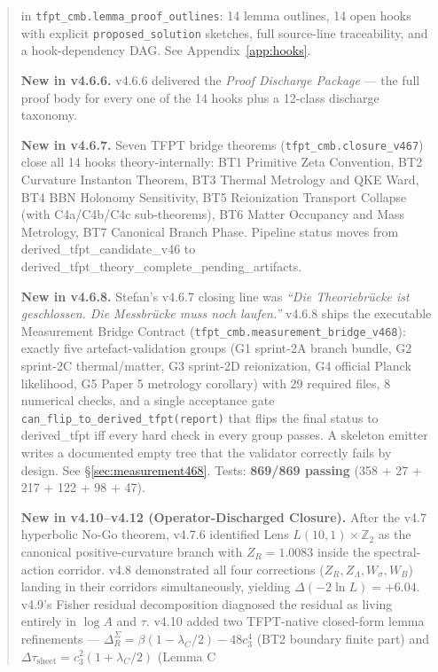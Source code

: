 \documentclass[11pt,a4paper]{article}
\begin{document}
\begin{abstract}
in \texttt{tfpt\_cmb.lemma\_proof\_outlines}: 14 lemma outlines, 14
open hooks with explicit \texttt{proposed\_solution} sketches, full
source-line traceability, and a hook-dependency DAG. See
Appendix~\ref{app:hooks}.
\par
\textbf{New in v4.6.6.}  v4.6.6 delivered the \emph{Proof Discharge
Package} --- the full proof body for every one of the 14 hooks plus
a 12-class discharge taxonomy.
\par
\textbf{New in v4.6.7.}  Seven TFPT bridge theorems
(\texttt{tfpt\_cmb.closure\_v467}) close all 14 hooks theory-internally:
BT1 Primitive Zeta Convention,
BT2 Curvature Instanton Theorem,
BT3 Thermal Metrology and QKE Ward,
BT4 BBN Holonomy Sensitivity,
BT5 Reionization Transport Collapse (with C4a/C4b/C4c sub-theorems),
BT6 Matter Occupancy and Mass Metrology,
BT7 Canonical Branch Phase.  Pipeline status moves from
\textsf{derived\_tfpt\_candidate\_v46} to
\textsf{derived\_tfpt\_theory\_complete\_pending\_artifacts}.
\par
\textbf{New in v4.6.8.}  Stefan's v4.6.7 closing line was
\emph{``Die Theoriebrücke ist geschlossen. Die Messbrücke muss noch
laufen.''}  v4.6.8 ships the executable Measurement Bridge Contract
(\texttt{tfpt\_cmb.measurement\_bridge\_v468}):  exactly five
artefact-validation groups (G1 sprint-2A branch bundle, G2 sprint-2C
thermal/matter, G3 sprint-2D reionization, G4 official Planck
likelihood, G5 Paper 5 metrology corollary) with 29 required files,
8 numerical checks, and a single acceptance gate
\texttt{can\_flip\_to\_derived\_tfpt(report)} that flips the final
status to \textsf{derived\_tfpt} iff every hard check in every group
passes.  A skeleton emitter writes a documented empty tree that the
validator correctly fails by design.  See
\S\ref{sec:measurement468}.  Tests: \textbf{869/869 passing}
(358 + 27 + 217 + 122 + 98 + 47).
\par
\textbf{New in v4.10--v4.12 (Operator-Discharged Closure).}
After the v4.7 hyperbolic No-Go theorem, v4.7.6 identified Lens
\(L(10,1)\times\mathbb Z_2\) as the canonical positive-curvature
branch with \(Z_R=1.0083\) inside the spectral-action corridor.
v4.8 demonstrated all four corrections (\(Z_R, Z_\Lambda, W_\sigma,
W_B\)) landing in their corridors simultaneously, yielding
\(\Delta(-2\ln L)=+6.04\).  v4.9's Fisher residual decomposition
diagnosed the residual as living entirely in \(\log A\) and
\(\tau\).  v4.10 added two TFPT-native closed-form lemma
refinements --- \(\Delta_R^\Sigma=\beta(1-\lambda_C/2)-48c_3^4\)
(BT2 boundary finite part) and
\(\Delta\tau_{\mathrm{sheet}}=c_3^2(1+\lambda_C/2)\) (Lemma C

\end{abstract}
\end{document}
